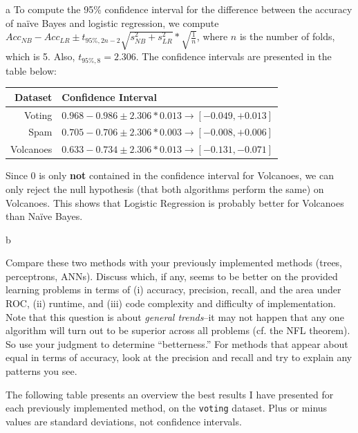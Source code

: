 \documentclass[fleqn]{homework}
\begin{document}
\begin{problem}{a}
    To compute the 95\% confidence interval for the difference between the
    accuracy of na\"ive Bayes and logistic regression, we compute
    $Acc_{NB} - Acc_{LR} \pm t_{95\%,2n-2} \sqrt{s_{NB}^2 + s_{LR}^2} *
    \sqrt{\frac{1}{n}}$,
    where $n$ is the number of folds, which is 5.  Also, $t_{95\%,8} = 2.306$.
    The confidence intervals are presented in the table below:

    \vspace{0.3cm}
    \begin{tabular}{rl}
      \hline
      Dataset & Confidence Interval \\
      \hline
      Voting & $0.968 - 0.986 \pm 2.306 * 0.013 \to [-0.049, +0.013]$ \\
      Spam & $0.705 - 0.706 \pm 2.306 * 0.003 \to [-0.008, +0.006]$ \\
      Volcanoes & $0.633 - 0.734 \pm 2.306 * 0.013 \to [-0.131, -0.071]$ \\
      \hline
    \end{tabular}
    \vspace{0.3cm}

    Since 0 is only \textbf{not} contained in the confidence interval for
    Volcanoes, we can only reject the null hypothesis (that both algorithms
    perform the same) on Volcanoes.  This shows that Logistic Regression is
    probably better for Volcanoes than Na\"ive Bayes.

  \end{problem}

  \begin{problem}{b}
    \begin{question}
      Compare these two methods with your previously implemented methods (trees,
      perceptrons, ANNs).  Discuss which, if any, seems to be better on the
      provided learning problems in terms of (i) accuracy, precision, recall,
      and the area under ROC, (ii) runtime, and (iii) code complexity and
      difficulty of implementation.  Note that this question is about
      \textit{general trends}--it may not happen that any one algorithm will
      turn out to be superior across all problems (cf. the NFL theorem).  So use
      your judgment to determine ``betterness.''  For methods that appear about
      equal in terms of accuracy, look at the precision and recall and try to
      explain any patterns you see.
    \end{question}
  \end{problem}

  The following table presents an overview the best results I have presented for
  each previously implemented method, on the \texttt{voting} dataset.  Plus or
  minus values are standard deviations, not confidence intervals.
\end{document}

